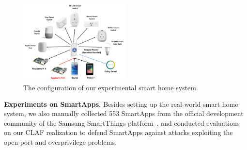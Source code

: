 \documentclass[letterpaper,12pt]{article}
\begin{document}
\begin{figure}[!htb]
        \centering
        \includegraphics[width=0.5\textwidth]{smarthomesys.png}
        \caption{The configuration of our experimental smart home system.}
        \label{fig:smarthomesys}
\end{figure}

\textbf{Experiments on SmartApps.} 
Besides setting up the real-world smart home system, we also manually collected 553 SmartApps from the official development community of the Samsung SmartThings platform~\cite{smartthingscommunity}, and conducted evaluations on our CLAF realization to defend SmartApps against attacks exploiting the open-port and overprivilege problems.
\end{document}
